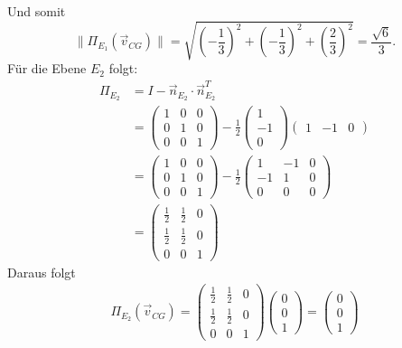 Und somit $$\|\Pi_{E_1}(\vec{v}_{CG})\| = \sqrt{\left( -\frac{1}{3}\right)^2+\left( -\frac{1}{3}\right)^2+\left( \frac{2}{3}\right)^2} = \frac{\sqrt{6}}{3}.$$
Für die Ebene $E_2$ folgt:
\begin{align}
        \Pi_{E_2} &= I - \vec{n}_{E_2} \cdot \vec{n}_{E_2} ^T\nonumber \\
        &=  \left(\begin{matrix}
            1 & 0 & 0 \\
            0 & 1 & 0 \\
            0 & 0 & 1
            \end{matrix}\right) - \frac{1}{2}\begin{pmatrix} 1 \\ -1 \\ 0 \end{pmatrix} \begin{pmatrix} 1 & -1 & 0 \end{pmatrix}  \nonumber \\
        &= \left(\begin{matrix}
            1 & 0 & 0 \\
            0 & 1 & 0 \\
            0 & 0 & 1
            \end{matrix}\right) - 
            \frac{1}{2}\left(\begin{matrix}
            1 & -1 & 0 \\
            -1 & 1 & 0 \\
            0 & 0 & 0
            \end{matrix}\right) \nonumber \\
        &= \left(\begin{matrix}
            \frac{1}{2} & \frac{1}{2} & 0 \\[3pt]
            \frac{1}{2} & \frac{1}{2} & 0 \\[3pt]
            0 & 0 & 1
            \end{matrix}\right) \nonumber
\end{align}
Daraus folgt
\begin{align}
    \Pi_{E_2}(\vec{v}_{CG}) = \left(\begin{matrix}
            \frac{1}{2} & \frac{1}{2} & 0 \\[3pt]
            \frac{1}{2} & \frac{1}{2} & 0 \\[3pt]
            0 & 0 & 1
            \end{matrix}\right) \begin{pmatrix} 0 \\ 0 \\ 1 \end{pmatrix} =  \begin{pmatrix} 0 \\ 0 \\ 1 \end{pmatrix} \nonumber
\end{align}
